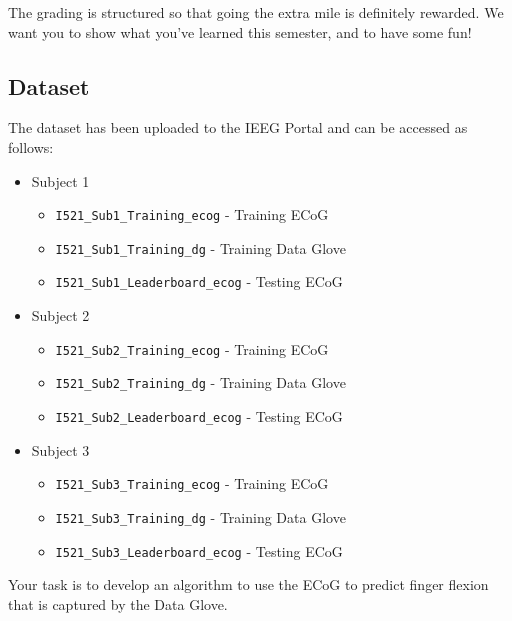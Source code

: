 \documentclass{article}
\begin{document}
\vspace{5mm}
The grading is structured so that going the extra mile is definitely rewarded. We want you to show what you’ve learned this semester, and to have some fun!


\subsection*{Dataset}
The dataset has been uploaded to the IEEG Portal and can be accessed as follows:
\begin{itemize}
    \item Subject 1
        \begin{itemize}
            \item \verb|I521_Sub1_Training_ecog| - Training ECoG
            \item \verb|I521_Sub1_Training_dg| - Training Data Glove
            \item \verb|I521_Sub1_Leaderboard_ecog| - Testing ECoG
        \end{itemize}
    \item Subject 2
        \begin{itemize}
            \item \verb|I521_Sub2_Training_ecog| - Training ECoG
            \item \verb|I521_Sub2_Training_dg| - Training Data Glove
            \item \verb|I521_Sub2_Leaderboard_ecog| - Testing ECoG
        \end{itemize}
    \item Subject 3
        \begin{itemize}
            \item \verb|I521_Sub3_Training_ecog| - Training ECoG
            \item \verb|I521_Sub3_Training_dg| - Training Data Glove
            \item \verb|I521_Sub3_Leaderboard_ecog| - Testing ECoG
        \end{itemize}
\end{itemize}

Your task is to develop an algorithm to use the ECoG to predict finger flexion that is captured by the Data Glove.
\end{document}
